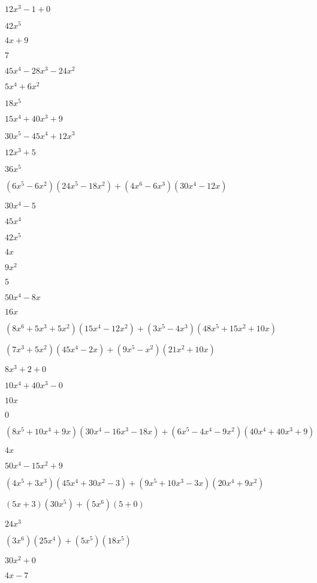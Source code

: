 \documentclass{article}
\begin{document}
\begin{multicols}{2}
$12x^{3}-1+0$\item $42x^{5}$\item $4x+9$\item $7$\item $45x^{4}-28x^{3}-24x^{2}$\item $5x^{4}+6x^{2}$\item $18x^{5}$\item $15x^{4}+40x^{3}+9$\item $30x^{5}-45x^{4}+12x^{3}$\item $12x^{3}+5$\item $36x^{5}$\item $(6x^{5}-6x^2)(24x^{5}-18x^{2})+(4x^{6}-6x^{3})(30x^{4}-12x)$\item $30x^{4}-5$\item $45x^{4}$\item $42x^{5}$\item $4x$\item $9x^{2}$\item $5$\item $50x^{4}-8x$\item $16x$\item $(8x^{6}+5x^{3}+5x^2)(15x^{4}-12x^{2})+(3x^{5}-4x^{3})(48x^{5}+15x^{2}+10x)$\item $(7x^{3}+5x^2)(45x^{4}-2x)+(9x^{5}-x^2)(21x^{2}+10x)$\item $8x^{3}+2+0$\item $10x^{4}+40x^{3}-0$\item $10x$\item $0$\item $(8x^{5}+10x^{4}+9x)(30x^{4}-16x^{3}-18x)+(6x^{5}-4x^{4}-9x^2)(40x^{4}+40x^{3}+9)$\item $4x$\item $50x^{4}-15x^{2}+9$\item $(4x^{5}+3x^{3})(45x^{4}+30x^{2}-3)+(9x^{5}+10x^{3}-3x)(20x^{4}+9x^{2})$\item $(5x+3)(30x^{5})+(5x^{6})(5+0)$\item $24x^{3}$\item $(3x^{6})(25x^{4})+(5x^{5})(18x^{5})$\item $30x^{2}+0$\item $4x-7$\item 
\end{multicols}
\end{document}
